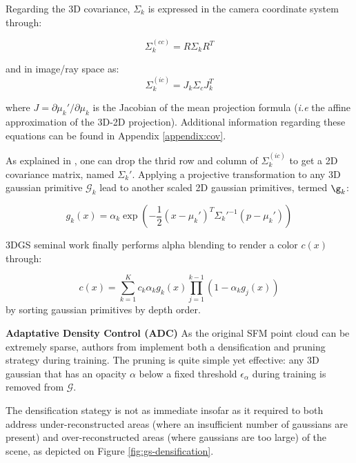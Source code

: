 Regarding the 3D covariance, $\Sigma_{k}$ is expressed in the camera coordinate system through: 

\begin{equation}
  \Sigma_{k}^{(cc)}= R\Sigma_{k}R^{T}
  \label{eq:gs-3dcov-transfrom}
\end{equation}

and in image/ray space as:
\begin{equation}
  \Sigma_{k}^{(ic)}= J_{k}\Sigma_{c}J_{k}^{T}
  \label{eq:gs-3d2dcov}
\end{equation}

where $J = \partial \mu_{k}' / \partial \mu_{k}$ is the Jacobian of the mean projection formula (\textit{i.e} the affine approximation of the 3D-2D projection). Additional information regarding these equations can be found in Appendix \ref{appendix:cov}. 

As explained in \citep{zwicker2001ewa}, one can drop the thrid row and column of $\Sigma_{k}^{(ic)}$ to get a 2D covariance matrix, named $\Sigma_{k}'$. Applying a projective transformation to any 3D gaussian primitive $\mathcal{G}_{k}$ lead to another scaled 2D gaussian primitives, termed $\g_{k}$: 

\begin{equation}
  g_{k}(x) = \alpha_{k}\exp(-\frac{1}{2}(x-\mu_{k}')^{T}\Sigma_{k}'^{-1}(p-\mu_{k}'))
\end{equation}

3DGS seminal work \citep{kerbl20233d} finally performs alpha blending to render a color $c(x)$ through: 

\begin{equation}
  c(x) = \sum_{k=1}^{K}c_{k}\alpha_{k}g_{k}(x)\prod_{j=1}^{k-1}(1-\alpha_{k}g_{j}(x))
\end{equation}
by sorting gaussian primitives by depth order. 

\noindent \textbf{Adaptative Density Control (ADC)} 
As the original \ac{SFM} point cloud can be extremely sparse, authors from \cite{kerbl20233d} implement both a densification and pruning strategy during training. The pruning is quite simple yet effective: any 3D gaussian that has an opacity $\alpha$ below a fixed threshold $\epsilon_{\alpha}$ during training is removed from $\mathcal{G}$. 

The densification stategy is not as immediate insofar as it required to both address under-reconstructed areas (where an insufficient number of gaussians are present) and over-reconstructed areas (where gaussians are too large) of the scene, as depicted on Figure \ref{fig:gs-densification}. 

